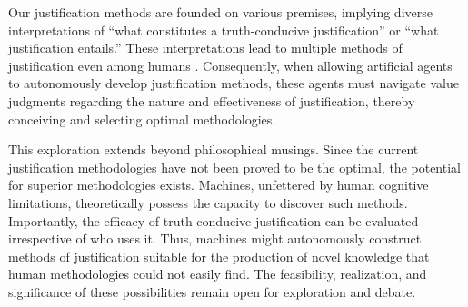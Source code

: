 Our justification methods are founded on various premises, implying diverse interpretations of ``what constitutes a truth-conducive justification'' or ``what justification entails.'' These interpretations lead to multiple methods of justification even among humans \cite{otsuka2022thinking}. Consequently, when allowing artificial agents to autonomously develop justification methods, these agents must navigate value judgments regarding the nature and effectiveness of justification, thereby conceiving and selecting optimal methodologies.

This exploration extends beyond philosophical musings. Since the current justification methodologies have not been proved to be the optimal, the potential for superior methodologies exists. Machines, unfettered by human cognitive limitations, theoretically possess the capacity to discover such methods. Importantly, the efficacy of truth-conducive justification can be evaluated irrespective of who uses it. Thus, machines might autonomously construct methods of justification suitable for the production of novel knowledge that human methodologies could not easily find. The feasibility, realization, and significance of these possibilities remain open for exploration and debate.




